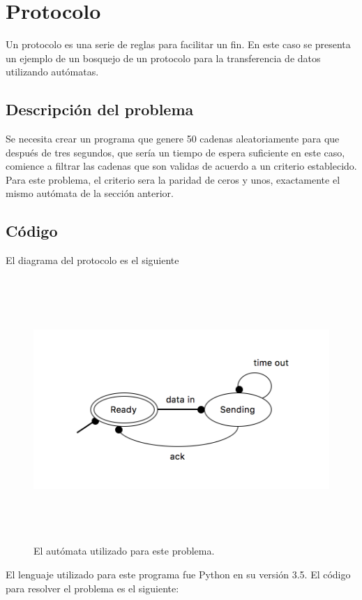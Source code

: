 \documentclass[12pt]{article}
\begin{document}
\newpage
\section{Protocolo}
Un protocolo es una serie de reglas para facilitar un fin. En este caso se presenta un ejemplo de un bosquejo de un protocolo para la transferencia de datos utilizando autómatas.

\subsection{Descripción del problema}
Se necesita crear un programa que genere 50 cadenas aleatoriamente para que después de tres segundos, que sería un tiempo de espera suficiente en este caso, comience a filtrar las cadenas que son validas de acuerdo a un criterio establecido. Para este problema, el criterio sera la paridad de ceros y unos, exactamente el mismo autómata de la sección anterior.

\subsection{Código}
El diagrama del protocolo es el siguiente \cite{stanford}

\begin{figure}[H]
\includegraphics[width=\textwidth, height=10cm]{automata_protocolo}
\caption{El autómata utilizado para este problema.}
\label{fig:automata_protocolo_modelo}
\end{figure}

El lenguaje utilizado para este programa fue Python en su versión 3.5. El código para resolver el problema es el siguiente:\\
\end{document}
